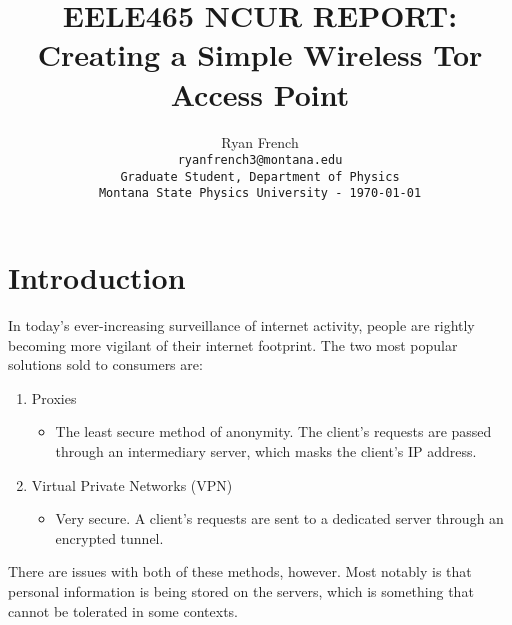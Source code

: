 \documentclass{article}
\title{EELE465 NCUR REPORT:\\ Creating a Simple Wireless Tor Access Point}
\author{Ryan French\\ \texttt{ryanfrench3@montana.edu}\\ \texttt{Graduate Student, Department of Physics}\\ \texttt{Montana State Physics University - \today}}
\date{}
\begin{document}
\maketitle %




\section*{Introduction}

In today's ever-increasing surveillance of internet activity, people are rightly becoming more vigilant of their internet footprint. The two most popular solutions sold to consumers are:

\begin{enumerate}
\item Proxies
\begin{itemize}
\item The least secure method of anonymity. The client's requests are passed through an intermediary server, which masks the client's IP address.
\end{itemize}
\item Virtual Private Networks (VPN)
\begin{itemize}
\item Very secure. A client's requests are sent to a dedicated server through an encrypted tunnel.
\end{itemize}
\end{enumerate}

There are issues with both of these methods, however. Most notably is that personal information is being stored on the servers, which is something that cannot be tolerated in some contexts.
\end{document}
